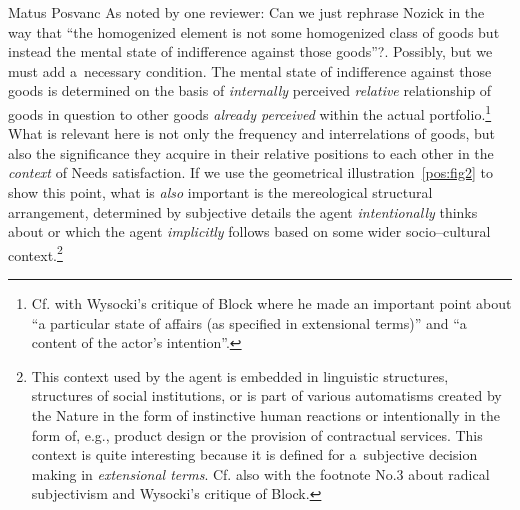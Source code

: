 \begin{artengenv}{Matus Posvanc}
As noted by one reviewer: Can we just rephrase Nozick in the way that ``the homogenized element is not some homogenized class of goods but instead the mental state of indifference against those goods''?. Possibly, but we must add a~necessary condition. The mental state of indifference against those goods is determined on the basis of \textit{internally} perceived \textit{relative} relationship of goods in question to other goods \textit{already perceived} within the actual portfolio.\footnote{Cf. with Wysocki's 
\parencite*[][pp.26–27]{Wysocki2021problem} %
 critique of Block where he made an important point about ``a particular state of affairs (as specified in extensional terms)'' and ``a content of the actor's intention''.} What is relevant here is not only the frequency and interrelations of goods, but also the significance they acquire in their relative positions to each other in the \textit{context} of Needs satisfaction. If we use the geometrical illustration~\ref{pos:fig2} to show this point, what is \textit{also} important is the mereological structural arrangement, determined by subjective details the agent \textit{intentionally} thinks about or which the agent \textit{implicitly} follows based on some wider socio–cultural context.\footnote{This context used by the agent is embedded in linguistic structures, structures of social institutions, or is part of various automatisms created by the Nature in the form of instinctive human reactions or intentionally in the form of, e.g., product design or the provision of contractual services. This context is quite interesting because it is defined for a~subjective decision making in \textit{extensional terms}. Cf. also with the footnote No.3 about radical subjectivism and Wysocki's 
\parencite*[][pp.26–27]{Wysocki2021problem} %
 critique of Block.}




\end{artengenv}
